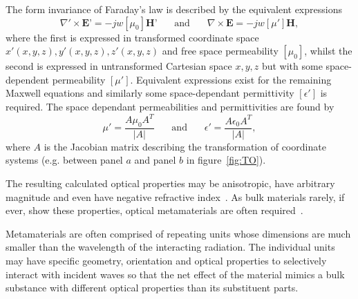 \documentclass[11pt]{iopart}
\begin{document}
The form invariance of Faraday's law is
described by the equivalent expressions
\begin{equation}
  \label{ME1}
  \nabla'\times \textbf{E'} = -jw[\mu_0]\textbf{H'}
  ~~~~~~~~\text{and}~~~~~~~~
  \nabla\times \textbf{E} = -jw[\mu']\textbf{H},
\end{equation}
where the first is expressed in transformed coordinate space $x'(x, y,
z), y'(x, y, z), z'(x, y, z)$ and free space permeability $[\mu_0]$,
whilst the second is expressed in untransformed Cartesian space $x, y,
z$ but with some space-dependent permeability $[\mu']$.  Equivalent
expressions exist for the remaining Maxwell equations and similarly
some space-dependant permittivity $[\epsilon']$ is required. The space
dependant permeabilities and permittivities are found by
\begin{equation}
  \label{eqn:J}
  \mu'=\frac{A\mu_0 A^T}{|A|}
  ~~~~~~~~\text{and}~~~~~~~~
  \epsilon'=\frac{A\epsilon_0 A^T}{|A|},
\end{equation}
where $A$ is the Jacobian matrix describing the transformation of
coordinate systems (e.g. between panel $a$ and panel $b$ in
figure~\ref{fig:TO}). 

The resulting calculated optical properties
may be anisotropic, have arbitrary magnitude and even have
negative refractive index~\cite{Pendry2000}. As bulk materials rarely, if ever, show these
properties, optical metamaterials are often
required~\cite{Smith2004}. 

Metamaterials are often comprised of
repeating units whose dimensions are much smaller than the wavelength
of the interacting radiation. The individual units may
have specific geometry, orientation and optical properties to
selectively interact with incident waves so that the net effect of the
material mimics a bulk substance with different optical properties
than its substituent parts.
\end{document}
